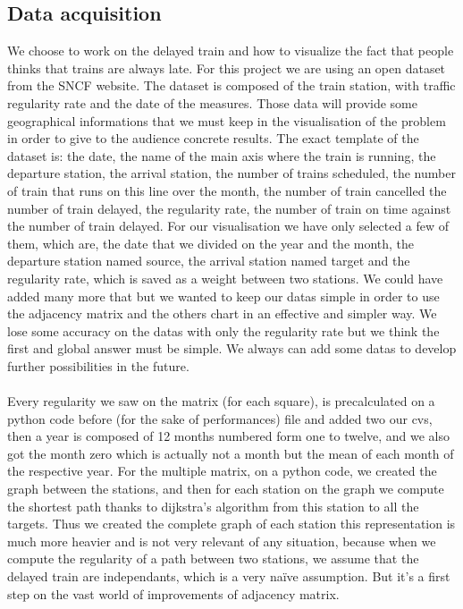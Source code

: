 \documentclass{vgtc}
\begin{document}
\subsection{Data acquisition}
\indent
We choose to work on the delayed train and how to visualize the fact that people thinks that trains are always late. For this project we are using an open dataset from the SNCF website. The dataset is composed of the train station, with traffic regularity rate and the date of the measures. Those data will provide some geographical informations that we must keep in the visualisation of the problem in order to give to the audience concrete results. The exact template of the dataset is: 
the date, the name of the main axis where the train is running, the departure station, the arrival station, the number of trains scheduled, the number of train that runs on this line over the month, the number of train cancelled the number of train delayed, the regularity rate, the number of train on time against the number of train delayed. For our visualisation we have only selected a few of them, which are, the date that we divided on the year and the month, the departure station named source, the arrival station named target and the regularity rate, which is saved as a weight between two stations. We could have added many more that but we wanted to keep our datas simple in order to use the adjacency matrix and the others chart in an effective and simpler way. We lose some accuracy on the datas with only the regularity rate but we think the first and global answer must be simple. We always can add some datas to develop further possibilities in the future.
\\
\\
\indent
Every regularity we saw on the matrix (for each square), is precalculated on a python code before (for the sake of performances) file and added two our cvs, then a year is composed of 12 months numbered form one to twelve, and we also got the month zero which is actually not a month but the mean of each month of the respective year.
For the multiple matrix, on a python code, we created the graph between the stations, and then for each station on the graph we compute the shortest path thanks to dijkstra's algorithm from this station to all the targets. Thus we created the complete graph of each station this representation is much more heavier and is not very relevant of any situation, because when we compute the regularity of a path between two stations, we assume that the delayed train are independants, which is a very naïve assumption. But it's a first step on the vast world of improvements of adjacency matrix.
\end{document}
